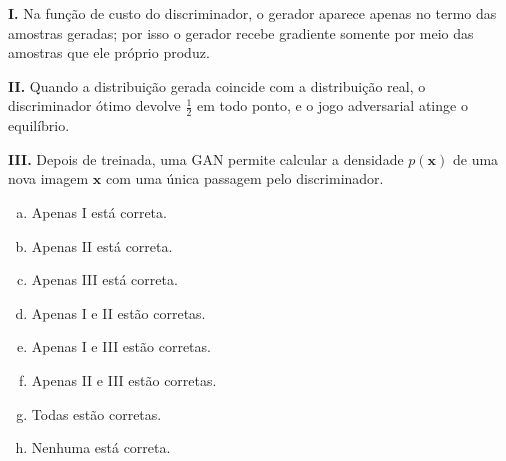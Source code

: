 \documentclass[11pt,a4paper]{article}
\newcommand{\thetav}{\boldsymbol{\theta}}
\begin{document}
\begin{enumerate}[1)]
\textbf{I.} Na função de custo do discriminador, o gerador aparece apenas no termo das amostras geradas; por isso o gerador recebe gradiente somente por meio das amostras que ele próprio produz.

\textbf{II.} Quando a distribuição gerada coincide com a distribuição real, o discriminador ótimo devolve $\tfrac{1}{2}$ em todo ponto, e o jogo adversarial atinge o equilíbrio.

\textbf{III.} Depois de treinada, uma GAN permite calcular a densidade $p(\mathbf{x})$ de uma nova imagem $\mathbf{x}$ com uma única passagem pelo discriminador.

\begin{center}
\end{center}

\begin{enumerate}[a)]
    \item Apenas I está correta.
    \item Apenas II está correta.
    \item Apenas III está correta.
    \item Apenas I e II estão corretas.
    \item Apenas I e III estão corretas.
    \item Apenas II e III estão corretas.
    \item Todas estão corretas.
    \item Nenhuma está correta.
\end{enumerate}


\end{enumerate}
\end{document}
